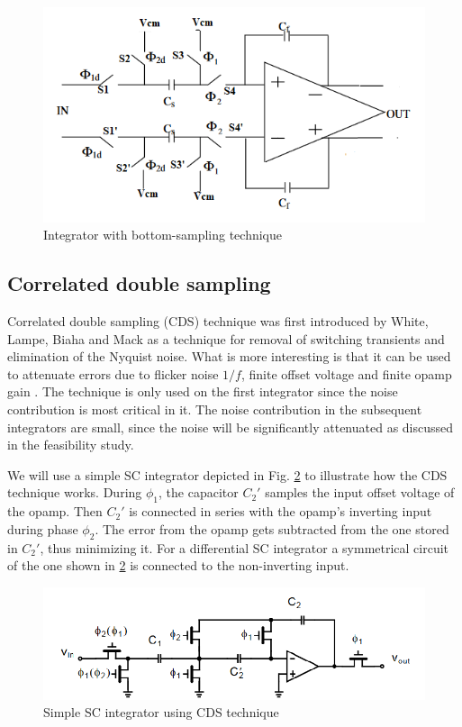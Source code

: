 \begin{figure}[ht]
\centering
\includegraphics[scale=0.7]{images/DT_integrator_delayed.png}
\caption{Integrator with bottom-sampling technique}
\label{fig:bottom_sampling}
\end{figure}

\subsection{Correlated double sampling}

Correlated double sampling (CDS) technique was first introduced by White, Lampe, Biaha and Mack \cite{cds} as a technique for removal of switching transients and elimination of the Nyquist noise. What is more interesting is that it can be used to attenuate errors due to flicker noise $1/f$, finite offset voltage and finite opamp gain \cite{corr}. The technique is only used on the first integrator since the noise contribution is most critical in it. The noise contribution in the subsequent integrators are small, since the noise will be significantly attenuated as discussed in the feasibility study. 

We will use a simple SC integrator depicted in Fig. \ref{fig:cds} to illustrate how the CDS technique works. During $\phi_1$, the capacitor $C_2'$ samples the input offset voltage of the opamp. Then $C_2'$ is connected in series with the opamp's inverting input during phase $\phi_2$. The error from the opamp gets subtracted from the one stored in $C_2'$, thus minimizing it. For a differential SC integrator a symmetrical circuit of the one shown in \ref{fig:cds} is connected to the non-inverting input.  

\begin{figure}[ht]
\centering
\includegraphics[width=\textwidth]{images/cds.png}
\caption{Simple SC integrator using CDS technique \cite{Johns} }
\label{fig:cds}
\end{figure}

